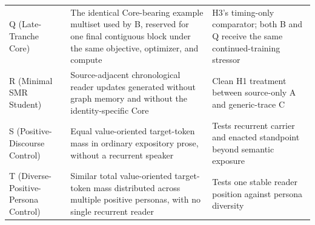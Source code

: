 \begin{longtable}{
  >{\raggedright\arraybackslash}p{3.1cm}
  >{\raggedright\arraybackslash}p{5.5cm}
  >{\raggedright\arraybackslash}p{6.4cm}}
        Q (Late-Tranche Core) & The identical Core-bearing example multiset used by B, reserved for one final contiguous block under the same objective, optimizer, and compute & H3's timing-only comparator; both B and Q receive the same continued-training stressor \\
        R (Minimal SMR Student) & Source-adjacent chronological reader updates generated without graph memory and without the identity-specific Core & Clean H1 treatment between source-only A and generic-trace C \\
        S (Positive-Discourse Control) & Equal value-oriented target-token mass in ordinary expository prose, without a recurrent speaker & Tests recurrent carrier and enacted standpoint beyond semantic exposure \\
        T (Diverse-Positive-Persona Control) & Similar total value-oriented target-token mass distributed across multiple positive personas, with no single recurrent reader & Tests one stable reader position against persona diversity \\
\end{longtable}
\endgroup

